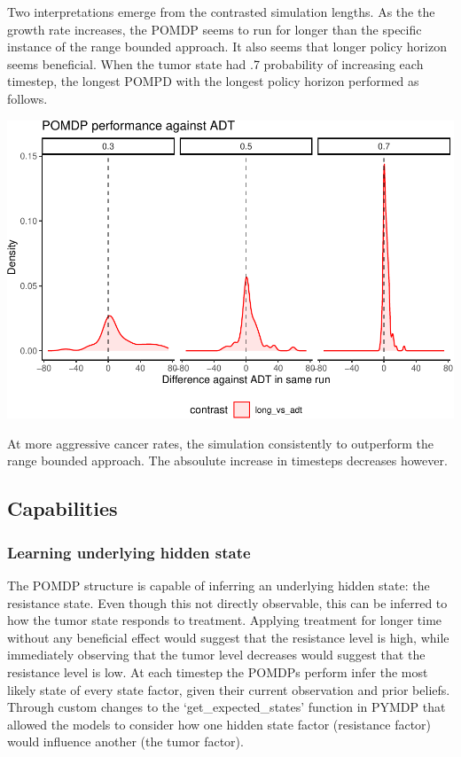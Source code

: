 \documentclass[notspecified,article,submit,moreauthors,pdftex]{Definitions/mdpi}
\begin{document}
Two interpretations emerge from the contrasted simulation lengths. As
the the growth rate increases, the POMDP seems to run for longer than
the specific instance of the range bounded approach. It also seems that
longer policy horizon seems beneficial. When the tumor state had .7
probability of increasing each timestep, the longest POMPD with the
longest policy horizon performed as follows.

\includegraphics{SocultPaper_files/figure-latex/unnamed-chunk-3-1.pdf}

At more aggressive cancer rates, the simulation consistently to
outperform the range bounded approach. The absoulute increase in
timesteps decreases however.

\subsection{Capabilities}\label{capabilities}

\subsubsection{Learning underlying hidden
state}\label{learning-underlying-hidden-state}

The POMDP structure is capable of inferring an underlying hidden state:
the resistance state. Even though this not directly observable, this can
be inferred to how the tumor state responds to treatment. Applying
treatment for longer time without any beneficial effect would suggest
that the resistance level is high, while immediately observing that the
tumor level decreases would suggest that the resistance level is low. At
each timestep the POMDPs perform infer the most likely state of every
state factor, given their current observation and prior beliefs. Through
custom changes to the `get\_expected\_states' function in PYMDP that
allowed the models to consider how one hidden state factor (resistance
factor) would influence another (the tumor factor).
\end{document}
